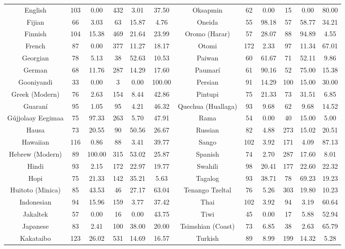 \begin{tabular}{cccccccccccc}
English & 103 & 0.00 & 432 & 3.01 & 37.50 & Oksapmin & 62 & 0.00 & 15 & 0.00 & 80.00 \\
Fijian & 66 & 3.03 & 63 & 15.87 & 4.76 & Oneida & 55 & 98.18 & 57 & 58.77 & 34.21 \\
Finnish & 104 & 15.38 & 469 & 21.64 & 23.99 & Oromo (Harar) & 57 & 28.07 & 88 & 94.89 & 4.55 \\
French & 87 & 0.00 & 377 & 11.27 & 18.17 & Otomi & 172 & 2.33 & 97 & 11.34 & 67.01 \\
Georgian & 78 & 5.13 & 38 & 52.63 & 10.53 & Paiwan & 60 & 61.67 & 71 & 52.11 & 9.86 \\
German & 68 & 11.76 & 287 & 14.29 & 17.60 & Paumarí & 61 & 90.16 & 52 & 75.00 & 15.38 \\
Gooniyandi & 33 & 0.00 & 3 & 0.00 & 100.00 & Persian & 91 & 14.29 & 100 & 15.00 & 30.00 \\
Greek (Modern) & 76 & 2.63 & 154 & 8.44 & 42.86 & Pintupi & 75 & 21.33 & 73 & 31.51 & 6.85 \\
Guaraní & 95 & 1.05 & 95 & 4.21 & 46.32 & Quechua (Huallaga) & 93 & 9.68 & 62 & 9.68 & 14.52 \\
Gújjolaay Eegimaa & 75 & 97.33 & 263 & 5.70 & 47.91 & Rama & 54 & 0.00 & 40 & 15.00 & 5.00 \\
Hausa & 73 & 20.55 & 90 & 50.56 & 26.67 & Russian & 82 & 4.88 & 273 & 15.02 & 20.51 \\
Hawaiian & 116 & 0.86 & 88 & 3.41 & 39.77 & Sango & 102 & 3.92 & 171 & 4.09 & 87.13 \\
Hebrew (Modern) & 89 & 100.00 & 315 & 53.02 & 25.87 & Spanish & 74 & 2.70 & 287 & 17.60 & 8.01 \\
Hindi & 93 & 2.15 & 172 & 22.97 & 19.77 & Swahili & 98 & 20.41 & 177 & 22.60 & 22.32 \\
Hopi & 75 & 21.33 & 142 & 35.21 & 5.63 & Tagalog & 93 & 38.71 & 78 & 69.23 & 19.23 \\
Huitoto (Minica) & 85 & 43.53 & 46 & 27.17 & 63.04 & Tenango Tzeltal & 76 & 5.26 & 303 & 19.80 & 10.23 \\
Indonesian & 94 & 15.96 & 159 & 3.77 & 37.42 & Thai & 102 & 3.92 & 94 & 3.19 & 60.64 \\
Jakaltek & 57 & 0.00 & 16 & 0.00 & 43.75 & Tiwi & 45 & 0.00 & 17 & 5.88 & 52.94 \\
Japanese & 83 & 2.41 & 100 & 38.00 & 20.00 & Tsimshian (Coast) & 73 & 6.85 & 38 & 2.63 & 65.79 \\
Kakataibo & 123 & 26.02 & 531 & 14.69 & 16.57 & Turkish & 89 & 8.99 & 199 & 14.32 & 5.28 \\

\end{tabular}

